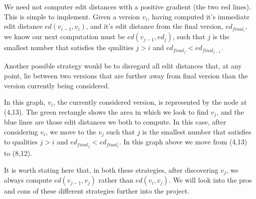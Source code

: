 \documentclass[a4paper,11pt,twoside,notitlepage]{article}
\begin{document}
        We need not computer edit distances with a positive gradient
        (the two red lines). This is simple to implement. Given a
        version $v_i$, having computed it's immediate edit distance
        $ed(v_{i-1},v_i)$, and it's edit distance from the final
        version, $ed_{final_i}$, we know our next computation must be
        $ed(v_{j-1},ed_j)$, such that $j$ is the smallest number that
        satisfies the qualities $j > i$ and $ed_{final_j} <
        ed_{final_{j-1}}$.

        Another possible strategy would be to disregard all edit
        distances that, at any point, lie between two versions that
        are further away from final version than the version
        currently being considered.

          \begin{center}
          \pgfplotsset{width=0.4\textwidth}
          \end{center}
        
        In this graph, $v_i$, the currently considered version, is
        represented by the node at (4,13). The green rectangle shows
        the area in which we look to find $v_j$, and the blue lines
        are those edit distances we both to compute. In this case,
        after considering $v_i$, we move to the $v_j$ such that $j$ is
        the smallest number that satisfies to qualities $j > i$ and
        $ed_{final_j} < ed_{final_i}$. In this graph above we move
        from (4,13) to (8,12).

        It is worth stating here that, in both these strategies, after
        discovering $v_j$, we always compute $ed(v_{j-1}, v_j)$ rather
        than $ed(v_i,v_j)$. We will look into the pros and cons of
        these different strategies further into the project.
\end{document}
